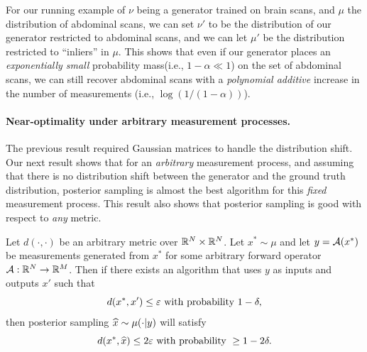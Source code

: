 %
%

For our running example of $\nu$ being a generator trained on brain scans, and $\mu$ the distribution of abdominal scans, we can set $\nu'$ to be the distribution of our generator restricted to abdominal scans, and we can let $\mu'$ be the distribution restricted to ``inliers'' in $\mu$. This shows that even if our generator places an \emph{exponentially small} probability mass(i.e., $1-\alpha \ll 1$) on the set of abdominal scans, we can still recover abdominal scans with a \emph{polynomial additive} increase in the number of measurements (i.e., $\log(1/(1-\alpha))$).

\paragraph{Near-optimality under arbitrary measurement processes.} The previous result required Gaussian matrices to handle the distribution shift. Our next result shows that for an \emph{arbitrary} measurement process, and assuming that there is no distribution shift between the generator and the ground truth distribution, posterior sampling is almost the best algorithm for this \emph{fixed}  measurement process.
This result also shows that posterior sampling is good with respect to \emph{any} metric.

{
  Let $d(\cdot, \cdot)$ be an arbitrary metric over $\mathbb{R}^N \times \mathbb{R}^N$. Let $x^* \sim \mu$ and let $y=\mathcal A(x^*)$ be measurements generated from
  $x^*$ for some arbitrary forward operator $\mathcal A:\mathbb{R}^N \to \mathbb{R}^M$. Then
  if there exists an algorithm that uses $y$ as inputs and outputs
  $x'$ such that 
  $$d(x^*, x') \leq \varepsilon \text{ with probability } 1 - \delta,$$
  then posterior sampling $\widehat{x} \sim \mu(\cdot | y)$ will satisfy
  $$d(x^* , \widehat{x}) \leq 2\varepsilon \text{ with probability } \geq 1 -
  2\delta.$$
}

